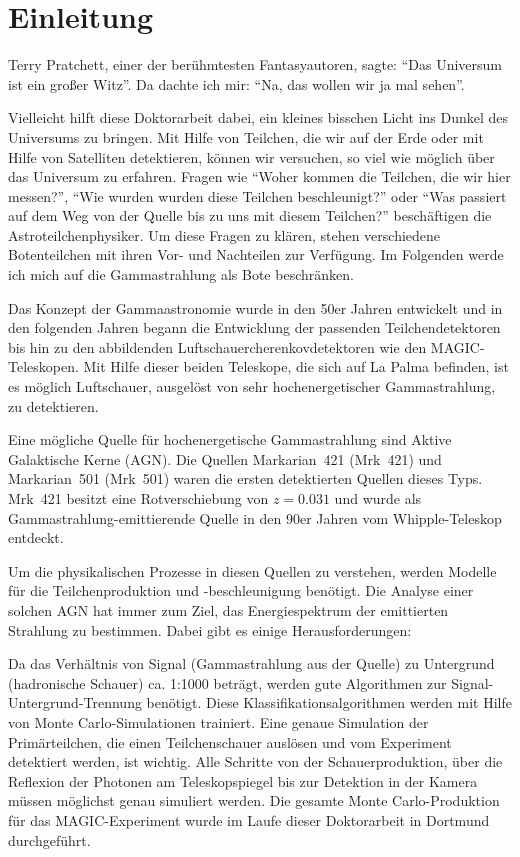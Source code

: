 \chapter{Einleitung}
Terry Pratchett, einer der berühmtesten Fantasyautoren, sagte: \enquote{Das Universum ist ein großer Witz}.
Da dachte ich mir: \enquote{Na, das wollen wir ja mal sehen}.

Vielleicht hilft diese Doktorarbeit dabei, ein kleines bisschen Licht ins Dunkel des Universums zu bringen.
Mit Hilfe von Teilchen, die wir auf der Erde oder mit Hilfe von Satelliten detektieren, können wir versuchen, so viel wie möglich über das Universum zu erfahren.
Fragen wie \enquote{Woher kommen die Teilchen, die wir hier messen?}, \enquote{Wie wurden wurden diese Teilchen beschleunigt?} oder \enquote{Was passiert auf dem Weg von der Quelle bis zu uns mit diesem Teilchen?} beschäftigen die Astroteilchenphysiker.
Um diese Fragen zu klären, stehen verschiedene Botenteilchen mit ihren Vor- und Nachteilen zur Verfügung.
Im Folgenden werde ich mich auf die Gammastrahlung als Bote beschränken.

Das Konzept der Gammaastronomie wurde in den 50er Jahren entwickelt und in den folgenden Jahren begann die Entwicklung der passenden Teilchendetektoren bis hin zu den abbildenden Luftschauercherenkovdetektoren wie den MAGIC-Teleskopen.
Mit Hilfe dieser beiden Teleskope, die sich auf La Palma befinden, ist es möglich Luftschauer, ausgelöst von sehr hochenergetischer Gammastrahlung, zu detektieren.

Eine mögliche Quelle für hochenergetische Gammastrahlung sind Aktive Galaktische Kerne (AGN).
Die Quellen Markarian~421 (Mrk~421) und Markarian~501 (Mrk~501) waren die ersten detektierten Quellen dieses Typs.
Mrk~421 besitzt eine Rotverschiebung von $z=0.031$ und wurde als Gammastrahlung-emittierende Quelle in den 90er Jahren vom Whipple-Teleskop entdeckt.

Um die physikalischen Prozesse in diesen Quellen zu verstehen, werden Modelle für die Teilchenproduktion und -beschleunigung benötigt.
Die Analyse einer solchen AGN hat immer zum Ziel, das Energiespektrum der emittierten Strahlung zu bestimmen.
Dabei gibt es einige Herausforderungen:

Da das Verhältnis von Signal (Gammastrahlung aus der Quelle) zu Untergrund (hadronische Schauer) ca. 1:1000 beträgt, werden gute Algorithmen zur Signal-Untergrund-Trennung benötigt.
Diese Klassifikationsalgorithmen werden mit Hilfe von Monte Carlo-Simulationen trainiert.
Eine genaue Simulation der Primärteilchen, die einen Teilchenschauer auslösen und vom Experiment detektiert werden, ist wichtig.
Alle Schritte von der Schauerproduktion, über die Reflexion der Photonen am Teleskopspiegel bis zur Detektion in der Kamera müssen möglichst genau simuliert werden.
Die gesamte Monte Carlo-Produktion für das MAGIC-Experiment wurde im Laufe dieser Doktorarbeit in Dortmund durchgeführt.

